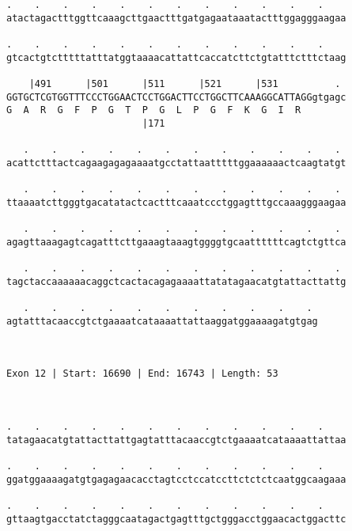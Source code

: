 \documentclass{article}
\begin{document}
\begin{Verbatim}
.    .    .    .    .    .    .    .    .    .    .    .    
atactagactttggttcaaagcttgaactttgatgagaataaatactttggagggaagaa
                                                            
.    .    .    .    .    .    .    .    .    .    .    .    
gtcactgtctttttatttatggtaaaacattattcaccatcttctgtatttctttctaag
                                                            
    |491      |501      |511      |521      |531          . 
GGTGCTCGTGGTTTCCCTGGAACTCCTGGACTTCCTGGCTTCAAAGGCATTAGGgtgagc
G  A  R  G  F  P  G  T  P  G  L  P  G  F  K  G  I  R        
                        |171                                
  
   .    .    .    .    .    .    .    .    .    .    .    . 
acattctttactcagaagagagaaaatgcctattaatttttggaaaaaactcaagtatgt
                                                            
   .    .    .    .    .    .    .    .    .    .    .    . 
ttaaaatcttgggtgacatatactcactttcaaatccctggagtttgccaaagggaagaa
                                                            
   .    .    .    .    .    .    .    .    .    .    .    . 
agagttaaagagtcagatttcttgaaagtaaagtggggtgcaattttttcagtctgttca
                                                            
   .    .    .    .    .    .    .    .    .    .    .    . 
tagctaccaaaaaacaggctcactacagagaaaattatatagaacatgtattacttattg
                                                            
   .    .    .    .    .    .    .    .    .    .    . 
agtatttacaaccgtctgaaaatcataaaattattaaggatggaaaagatgtgag
                                                       
                                                       
 
Exon 12 | Start: 16690 | End: 16743 | Length: 53



.    .    .    .    .    .    .    .    .    .    .    .    
tatagaacatgtattacttattgagtatttacaaccgtctgaaaatcataaaattattaa
                                                            
.    .    .    .    .    .    .    .    .    .    .    .    
ggatggaaaagatgtgagagaacacctagtcctccatccttctctctcaatggcaagaaa
                                                            
.    .    .    .    .    .    .    .    .    .    .    .    
gttaagtgacctatctagggcaatagactgagtttgctgggacctggaacactggacttc
                                                            

\end{Verbatim}
\end{document}
